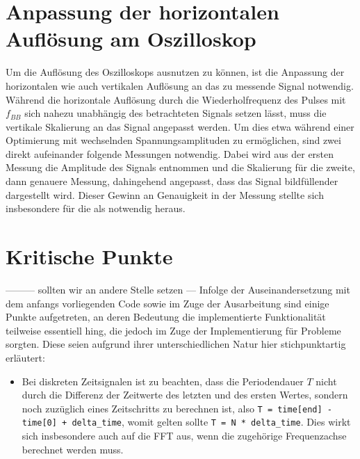 \documentclass[../Report.tex]{subfiles}
\begin{document}
\section{Anpassung der horizontalen Auflösung am Oszilloskop}

Um die Auflösung des Oszilloskops ausnutzen zu können, ist die Anpassung der horizontalen wie auch vertikalen Auflösung an das zu messende Signal notwendig.
Während die horizontale Auflösung durch die Wiederholfrequenz des Pulses mit $f_{BB}$ sich nahezu unabhängig des betrachteten Signals setzen lässt, muss die vertikale Skalierung an das Signal angepasst werden. Um dies etwa während einer Optimierung mit wechselnden Spannungsamplituden zu ermöglichen, sind zwei direkt aufeinander folgende Messungen notwendig. Dabei wird aus der ersten Messung die Amplitude des Signals entnommen und die Skalierung für die zweite, dann genauere Messung, dahingehend angepasst, dass das Signal bildfüllender dargestellt wird.
Dieser Gewinn an Genauigkeit in der Messung stellte sich insbesondere für die  als notwendig heraus.


\section{Kritische Punkte}
\label{sec:vorg.critical}
--------- sollten wir an andere Stelle setzen ---
Infolge der Auseinandersetzung mit dem anfangs vorliegenden Code sowie im Zuge der Ausarbeitung sind einige Punkte aufgetreten, an deren Bedeutung die implementierte Funktionalität teilweise essentiell hing, die jedoch im Zuge der Implementierung für Probleme sorgten. Diese seien aufgrund ihrer unterschiedlichen Natur hier stichpunktartig erläutert:
\begin{itemize}
	\item	Bei diskreten Zeitsignalen ist zu beachten, dass die Periodendauer $T$ nicht durch die Differenz der Zeitwerte des letzten und des ersten Wertes, sondern noch zuzüglich eines Zeitschritts  zu berechnen ist, also \lstinline{T = time[end] - time[0] + delta_time}, womit gelten sollte \lstinline{T = N * delta_time}. Dies wirkt sich insbesondere auch auf die FFT aus, wenn die zugehörige Frequenzachse berechnet werden muss.
\end{itemize}
\end{document}
